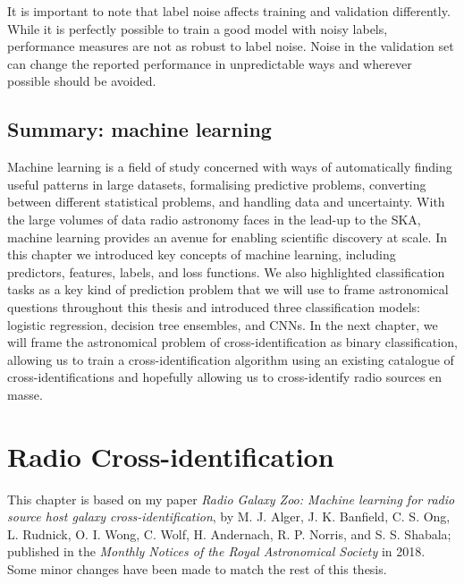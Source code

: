 \documentclass[11pt, a4paper]{book}
\begin{document}
        It is important to note that label noise affects training and validation differently. While it is perfectly possible to train a good model with noisy labels, performance measures are not as robust to label noise. Noise in the validation set can change the reported performance in unpredictable ways and wherever possible should be avoided.


\section{Summary: machine learning}
\label{sec:summary-ml}

    Machine learning is a field of study concerned with ways of automatically finding useful patterns in large datasets, formalising predictive problems, converting between different statistical problems, and handling data and uncertainty. With the large volumes of data radio astronomy faces in the lead-up to the SKA, machine learning provides an avenue for enabling scientific discovery at scale. In this chapter we introduced key concepts of machine learning, including predictors, features, labels, and loss functions. We also highlighted classification tasks as a key kind of prediction problem that we will use to frame astronomical questions throughout this thesis and introduced three classification models: logistic regression, decision tree ensembles, and CNNs. In the next chapter, we will frame the astronomical problem of cross-identification as binary classification, allowing us to train a cross-identification algorithm using an existing catalogue of cross-identifications and hopefully allowing us to cross-identify radio sources en masse.

\chapter{Radio Cross-identification}
\label{cha:cross-id}


This chapter is based on my paper \emph{Radio Galaxy Zoo: Machine learning for radio source host galaxy cross-identification}, by M. J. Alger, J. K. Banfield, C. S. Ong, L. Rudnick, O. I. Wong, C. Wolf, H. Andernach, R. P. Norris, and S. S. Shabala; published in the \emph{Monthly Notices of the Royal Astronomical Society} in 2018. Some minor changes have been made to match the rest of this thesis.\\
\end{document}

